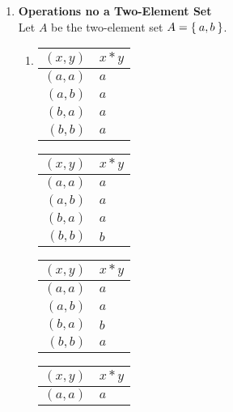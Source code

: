 \begin{enumerate}[label={\Alph*.},font={\bfseries}]
  \item {\bf Operations no a Two-Element Set} \\
    Let $A$ be the two-element set $A=\Set{a,b}$.
    \begin{enumerate}[label={\arabic*},font={\bfseries}]
      \item
        \begin{minipage}[h]{.25\textwidth}
          \begin{tabular}{ r | l }
            $(x,y)$ & $x*y$ \\
            \hline
            $(a,a)$ & $a$ \\
            $(a,b)$ & $a$ \\
            $(b,a)$ & $a$ \\
            $(b,b)$ & $a$
          \end{tabular}
        \end{minipage}
        \begin{minipage}[h]{.25\textwidth}
          \begin{tabular}{ r | l }
            $(x,y)$ & $x*y$ \\
            \hline
            $(a,a)$ & $a$ \\
            $(a,b)$ & $a$ \\
            $(b,a)$ & $a$ \\
            $(b,b)$ & $b$
          \end{tabular}
        \end{minipage}
        \begin{minipage}[h]{.25\textwidth}
          \begin{tabular}{ r | l }
            $(x,y)$ & $x*y$ \\
            \hline
            $(a,a)$ & $a$ \\
            $(a,b)$ & $a$ \\
            $(b,a)$ & $b$ \\
            $(b,b)$ & $a$
          \end{tabular}
        \end{minipage}
        \begin{minipage}[h]{.25\textwidth}
          \begin{tabular}{ r | l }
            $(x,y)$ & $x*y$ \\
            \hline
            $(a,a)$ & $a$ \\

\end{tabular}
\end{minipage}
\end{enumerate}
\end{enumerate}
